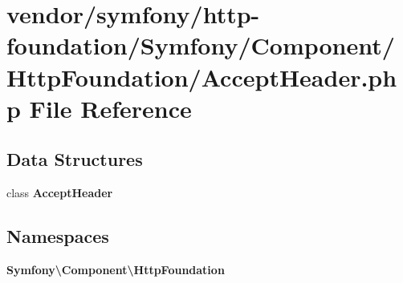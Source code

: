 \section{vendor/symfony/http-\/foundation/\+Symfony/\+Component/\+Http\+Foundation/\+Accept\+Header.php File Reference}
\label{_accept_header_8php}
\subsection*{Data Structures}
\begin{DoxyCompactItemize}
\item 
class {\bf Accept\+Header}
\end{DoxyCompactItemize}
\subsection*{Namespaces}
\begin{DoxyCompactItemize}
\item 
 {\bf Symfony\textbackslash{}\+Component\textbackslash{}\+Http\+Foundation}
\end{DoxyCompactItemize}
